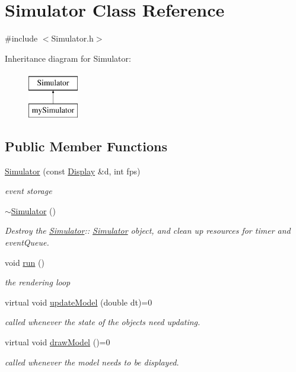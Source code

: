\hypertarget{class_simulator}{}\section{Simulator Class Reference}
\label{class_simulator}


{\ttfamily \#include $<$Simulator.\+h$>$}

Inheritance diagram for Simulator\+:\begin{figure}[H]
\begin{center}
\leavevmode
\includegraphics[height=2.000000cm]{dd/dd1/class_simulator}
\end{center}
\end{figure}
\subsection*{Public Member Functions}
\begin{DoxyCompactItemize}
\item 
\mbox{\hyperlink{class_simulator_ac76c0369824f7d70f0d6cb98859d0b1d}{Simulator}} (const \mbox{\hyperlink{class_display}{Display}} \&d, int fps)
\begin{DoxyCompactList}\small\item\em event storage \end{DoxyCompactList}\item 
\mbox{\hyperlink{class_simulator_a0f49aa04f42060a785adf77346b9de9f}{$\sim$\+Simulator}} ()
\begin{DoxyCompactList}\small\item\em Destroy the \mbox{\hyperlink{class_simulator}{Simulator}}\+:\+: \mbox{\hyperlink{class_simulator}{Simulator}} object, and clean up resources for timer and event\+Queue. \end{DoxyCompactList}\item 
void \mbox{\hyperlink{class_simulator_aa2de7e32b04cc3e8fc60aec23997621b}{run}} ()
\begin{DoxyCompactList}\small\item\em the rendering loop \end{DoxyCompactList}\item 
virtual void \mbox{\hyperlink{class_simulator_a78e300570318b9cd65f52b9547dee070}{update\+Model}} (double dt)=0
\begin{DoxyCompactList}\small\item\em called whenever the state of the objects need updating. \end{DoxyCompactList}\item 
virtual void \mbox{\hyperlink{class_simulator_ad47f95a2a5201a46f760c14d63d84725}{draw\+Model}} ()=0
\begin{DoxyCompactList}\small\item\em called whenever the model needs to be displayed. \end{DoxyCompactList}\end{DoxyCompactItemize}


